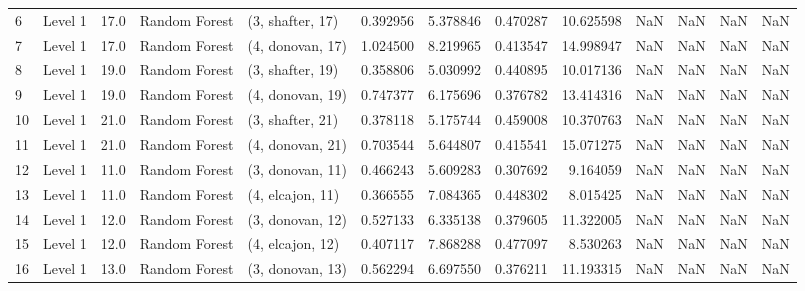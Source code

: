 \begin{tabular}{llrllrrrrrrrr}
6  &   Level 1 &   17.0 &  Random Forest &  (3, shafter, 17) &   0.392956 &   5.378846 &  0.470287 &  10.625598 &                  NaN &                    NaN &                 NaN &                   NaN \\
7  &   Level 1 &   17.0 &  Random Forest &  (4, donovan, 17) &   1.024500 &   8.219965 &  0.413547 &  14.998947 &                  NaN &                    NaN &                 NaN &                   NaN \\
8  &   Level 1 &   19.0 &  Random Forest &  (3, shafter, 19) &   0.358806 &   5.030992 &  0.440895 &  10.017136 &                  NaN &                    NaN &                 NaN &                   NaN \\
9  &   Level 1 &   19.0 &  Random Forest &  (4, donovan, 19) &   0.747377 &   6.175696 &  0.376782 &  13.414316 &                  NaN &                    NaN &                 NaN &                   NaN \\
10 &   Level 1 &   21.0 &  Random Forest &  (3, shafter, 21) &   0.378118 &   5.175744 &  0.459008 &  10.370763 &                  NaN &                    NaN &                 NaN &                   NaN \\
11 &   Level 1 &   21.0 &  Random Forest &  (4, donovan, 21) &   0.703544 &   5.644807 &  0.415541 &  15.071275 &                  NaN &                    NaN &                 NaN &                   NaN \\
12 &   Level 1 &   11.0 &  Random Forest &  (3, donovan, 11) &   0.466243 &   5.609283 &  0.307692 &   9.164059 &                  NaN &                    NaN &                 NaN &                   NaN \\
13 &   Level 1 &   11.0 &  Random Forest &  (4, elcajon, 11) &   0.366555 &   7.084365 &  0.448302 &   8.015425 &                  NaN &                    NaN &                 NaN &                   NaN \\
14 &   Level 1 &   12.0 &  Random Forest &  (3, donovan, 12) &   0.527133 &   6.335138 &  0.379605 &  11.322005 &                  NaN &                    NaN &                 NaN &                   NaN \\
15 &   Level 1 &   12.0 &  Random Forest &  (4, elcajon, 12) &   0.407117 &   7.868288 &  0.477097 &   8.530263 &                  NaN &                    NaN &                 NaN &                   NaN \\
16 &   Level 1 &   13.0 &  Random Forest &  (3, donovan, 13) &   0.562294 &   6.697550 &  0.376211 &  11.193315 &                  NaN &                    NaN &                 NaN &                   NaN \\

\end{tabular}
